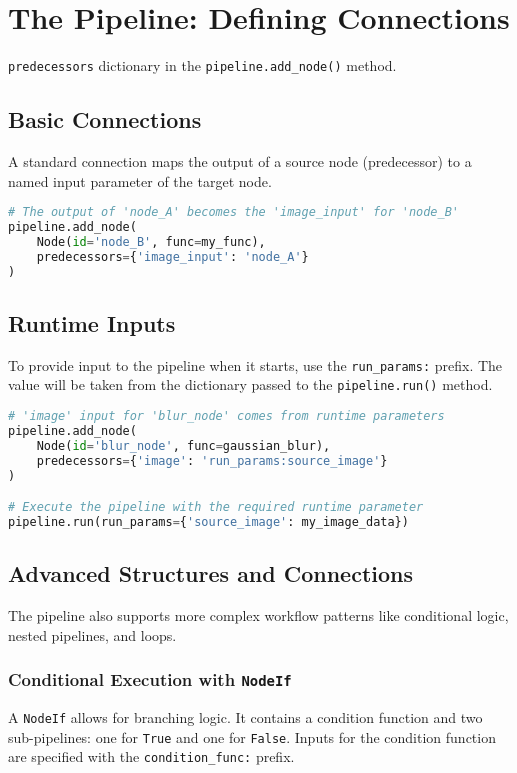 \documentclass[12pt]{article}
\begin{document}
\section{The Pipeline: Defining Connections}
\texttt{predecessors} dictionary in the \texttt{pipeline.add\_node()} method.

\subsection{Basic Connections}
A standard connection maps the output of a source node (predecessor) to a named input parameter of the target node.

\begin{lstlisting}[language=python, caption={Basic node connection}]
# The output of 'node_A' becomes the 'image_input' for 'node_B'
pipeline.add_node(
    Node(id='node_B', func=my_func),
    predecessors={'image_input': 'node_A'}
)
\end{lstlisting}

\subsection{Runtime Inputs}
To provide input to the pipeline when it starts, use the \texttt{run\_params:} prefix. The value will be taken from the dictionary passed to the \texttt{pipeline.run()} method.

\begin{lstlisting}[language=python, caption={Providing a runtime input}]
# 'image' input for 'blur_node' comes from runtime parameters
pipeline.add_node(
    Node(id='blur_node', func=gaussian_blur),
    predecessors={'image': 'run_params:source_image'}
)

# Execute the pipeline with the required runtime parameter
pipeline.run(run_params={'source_image': my_image_data})
\end{lstlisting}

\subsection{Advanced Structures and Connections}
The pipeline also supports more complex workflow patterns like conditional logic, nested pipelines, and loops.

\subsubsection{Conditional Execution with \texttt{NodeIf}}
A \texttt{NodeIf} allows for branching logic. It contains a condition function and two sub-pipelines: one for \texttt{True} and one for \texttt{False}. Inputs for the condition function are specified with the \texttt{condition\_func:} prefix.
\end{document}
